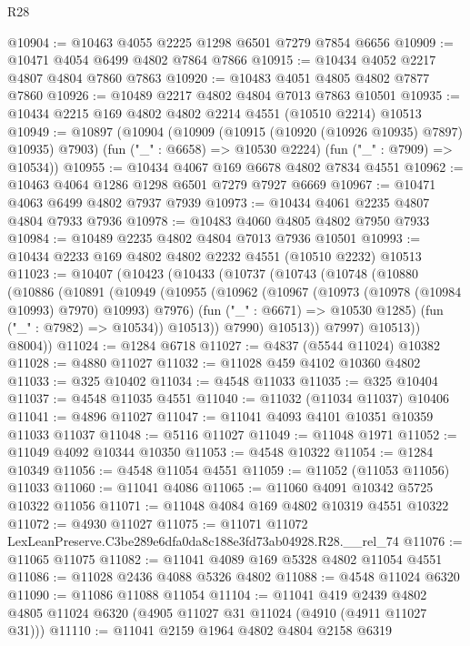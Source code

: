 \begin{lexlean}{R28}
\begin{coremodule}
@10904 := @10463 @4055 @2225 @1298 @6501 @7279 @7854 @6656
@10909 := @10471 @4054 @6499 @4802 @7864 @7866
@10915 := @10434 @4052 @2217 @4807 @4804 @7860 @7863
@10920 := @10483 @4051 @4805 @4802 @7877 @7860
@10926 := @10489 @2217 @4802 @4804 @7013 @7863 @10501
@10935 := @10434 @2215 @169 @4802 @4802 @2214 @4551 (@10510 @2214) @10513
@10949 := @10897
    (@10904
      (@10909 (@10915 (@10920 (@10926 @10935) @7897) @10935) @7903)
      (fun ("_" : @6658) => @10530 @2224)
      (fun ("_" : @7909) => @10534))
@10955 := @10434 @4067 @169 @6678 @4802 @7834 @4551
@10962 := @10463 @4064 @1286 @1298 @6501 @7279 @7927 @6669
@10967 := @10471 @4063 @6499 @4802 @7937 @7939
@10973 := @10434 @4061 @2235 @4807 @4804 @7933 @7936
@10978 := @10483 @4060 @4805 @4802 @7950 @7933
@10984 := @10489 @2235 @4802 @4804 @7013 @7936 @10501
@10993 := @10434 @2233 @169 @4802 @4802 @2232 @4551 (@10510 @2232) @10513
@11023 := @10407
    (@10423
      (@10433
        (@10737
          (@10743
            (@10748
              (@10880
                (@10886
                  (@10891
                    (@10949
                      (@10955
                        (@10962
                          (@10967 (@10973 (@10978 (@10984 @10993) @7970) @10993) @7976)
                          (fun ("_" : @6671) => @10530 @1285)
                          (fun ("_" : @7982) => @10534))
                        @10513))
                    @7990)
                  @10513))
              @7997)
            @10513))
        @8004))
@11024 := @1284 @6718
@11027 := @4837 (@5544 @11024) @10382
@11028 := @4880 @11027
@11032 := @11028 @459 @4102 @10360 @4802
@11033 := @325 @10402
@11034 := @4548 @11033
@11035 := @325 @10404
@11037 := @4548 @11035 @4551
@11040 := @11032 (@11034 @11037) @10406
@11041 := @4896 @11027
@11047 := @11041 @4093 @4101 @10351 @10359 @11033 @11037
@11048 := @5116 @11027
@11049 := @11048 @1971
@11052 := @11049 @4092 @10344 @10350
@11053 := @4548 @10322
@11054 := @1284 @10349
@11056 := @4548 @11054 @4551
@11059 := @11052 (@11053 @11056) @11033
@11060 := @11041 @4086
@11065 := @11060 @4091 @10342 @5725 @10322 @11056
@11071 := @11048 @4084 @169 @4802 @10319 @4551 @10322
@11072 := @4930 @11027
@11075 := @11071 @11072 LexLeanPreserve.C3be289e6dfa0da8c188e3fd73ab04928.R28.__rel_74
@11076 := @11065 @11075
@11082 := @11041 @4089 @169 @5328 @4802 @11054 @4551
@11086 := @11028 @2436 @4088 @5326 @4802
@11088 := @4548 @11024 @6320
@11090 := @11086 @11088 @11054
@11104 := @11041
    @419
    @2439
    @4802
    @4805
    @11024
    @6320
    (@4905 @11027 @31 @11024 (@4910 (@4911 @11027 @31)))
@11110 := @11041 @2159 @1964 @4802 @4804 @2158 @6319

\end{coremodule}
\end{lexlean}

